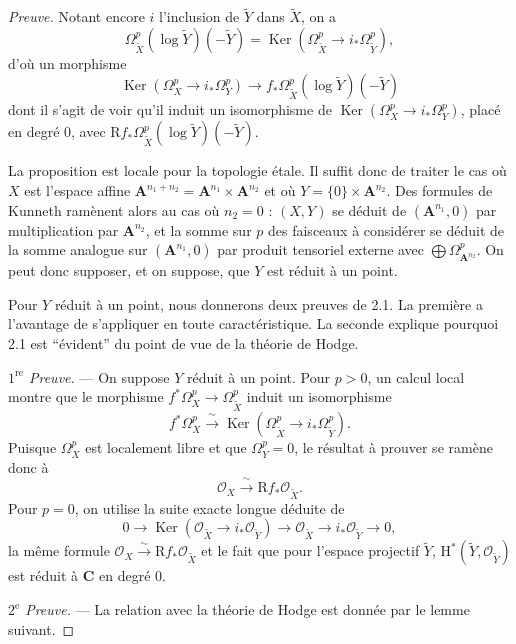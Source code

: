 \documentclass[12pt,a4paper]{article}
\theoremstyle{plain}
\theoremstyle{definition}
\DeclareMathOperator{\Ker}{Ker}
\begin{document}
\begin{proof}[Preuve]
Notant encore $i$ l'inclusion de $\tilde{Y}$ dans $\tilde{X}$, on a
\[
\Omega_{\tilde{X}}^p(\log \tilde{Y})(-\tilde{Y}) = \Ker(\Omega_{\tilde{X}}^p \to i_* \Omega_{\tilde{Y}}^p),
\]
d'où un morphisme
\[
\Ker(\Omega_X^p \to i_* \Omega_Y^p) \to f_* \Omega_{\tilde{X}}^p(\log \tilde{Y})(-\tilde{Y})
\]
dont il s'agit de voir qu'il induit un isomorphisme de $\Ker(\Omega_X^p \to i_* \Omega_Y^p)$, placé en degré 0, avec $\mathrm{R}f_* \Omega_{\tilde{X}}^p(\log \tilde{Y})(-\tilde{Y})$.

La proposition est locale pour la topologie étale. Il suffit donc de traiter le cas où $X$ est l'espace affine $\mathbf{A}^{n_1+n_2} = \mathbf{A}^{n_1} \times \mathbf{A}^{n_2}$ et où $Y = \{0\} \times \mathbf{A}^{n_2}$. Des formules de Kunneth ramènent alors au cas où $n_2 = 0$ : $(X, Y)$ se déduit de $(\mathbf{A}^{n_1}, 0)$ par multiplication par $\mathbf{A}^{n_2}$, et la somme sur $p$ des faisceaux à considérer se déduit de la somme analogue sur $(\mathbf{A}^{n_1}, 0)$ par produit tensoriel externe avec $\bigoplus \Omega_{\mathbf{A}^{n_2}}^p$. On peut donc supposer, et on suppose, que $Y$ est réduit à un point.

Pour $Y$ réduit à un point, nous donnerons deux preuves de 2.1. La première a l'avantage de s'appliquer en toute caractéristique. La seconde explique pourquoi 2.1 est ``évident'' du point de vue de la théorie de Hodge.

\smallskip
\textit{$1^{\text{re}}$ Preuve.} --- On suppose $Y$ réduit à un point. Pour $p > 0$, un calcul local montre que le morphisme $f^* \Omega_X^p \to \Omega_{\tilde{X}}^p$ induit un isomorphisme
\[
f^* \Omega_X^p \xrightarrow{\;\sim\;} \Ker(\Omega_{\tilde{X}}^p \to i_* \Omega_{\tilde{Y}}^p).
\]
Puisque $\Omega_X^p$ est localement libre et que $\Omega_Y^p = 0$, le résultat à prouver se ramène donc à
\[
\mathscr{O}_X \xrightarrow{\;\sim\;} \mathrm{R}f_* \mathscr{O}_{\tilde{X}}.
\]
Pour $p = 0$, on utilise la suite exacte longue déduite de
\[
0 \to \Ker(\mathscr{O}_{\tilde{X}} \to i_* \mathscr{O}_{\tilde{Y}}) \to \mathscr{O}_{\tilde{X}} \to i_* \mathscr{O}_{\tilde{Y}} \to 0,
\]
la même formule $\mathscr{O}_X \xrightarrow{\;\sim\;} \mathrm{R}f_* \mathscr{O}_{\tilde{X}}$ et le fait que pour l'espace projectif $\tilde{Y}$, $\mathrm{H}^*(\tilde{Y}, \mathscr{O}_{\tilde{Y}})$ est réduit à $\mathbf{C}$ en degré 0.

\smallskip
\textit{$2^{\text{e}}$ Preuve.} --- La relation avec la théorie de Hodge est donnée par le lemme suivant.


\end{proof}
\end{document}
